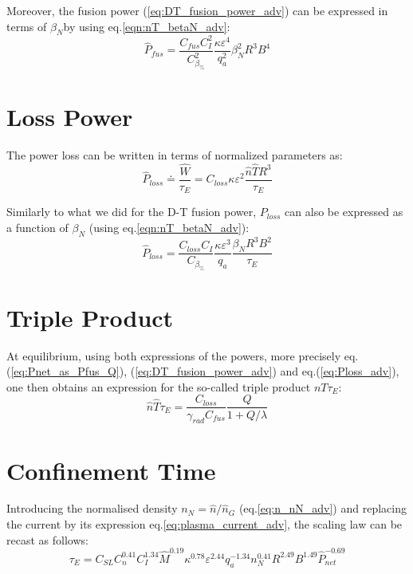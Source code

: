 Moreover, the fusion power (\ref{eq:DT_fusion_power_adv}) can be expressed in terms of $\beta_N$by using eq.\ref{eqn:nT_betaN_adv}:
\begin{equation}
\boxed{
		\hat P_{fus} 
	= 
	\frac{C_{fus}C_I^2}{C_{\beta_\%}^2} \frac{\kappa \varepsilon^4}{q_a^2} 
	\beta_N^2 R^3 B^4
}
\label{eq:DT_fusion_power_betaN_adv}
\end{equation}

\section{Loss Power}
The power loss can be written in terms of normalized parameters as:
\begin{equation}
	\hat P_{loss} \doteq \frac{\hat W}{\tau_E} 
	= C_{loss} \kappa \varepsilon^2  \frac{\hat n \hat T R^3}{\tau_E}
\label{eq:Ploss_adv}
\end{equation}

Similarly to what we did for the D-T fusion power, $P_{loss}$ can also be expressed as a function of $\beta_N$ (using eq.\ref{eqn:nT_betaN_adv}):
\begin{equation}
	\hat P_{loss} 
	= 
	\frac{C_{loss}C_I}{C_{\beta_\%}}  \frac{\kappa \varepsilon^3}{q_a}
	\frac{\beta_N R^3 B^2}{\tau_E}
\label{eq:Ploss_betaN_adv}
\end{equation}

\section{Triple Product}
At equilibrium, using both expressions of the powers, more precisely eq.(\ref{eq:Pnet_as_Pfus_Q}), (\ref{eq:DT_fusion_power_adv}) and eq.(\ref{eq:Ploss_adv}), one then obtains an expression for the so-called triple product $nT\tau_E$:
\begin{equation}
	\hat n \hat T \tau_E = \frac{C_{loss}}{\gamma_{rad} C_{fus}} \frac{Q}{1+Q/\lambda}
\label{eq:nTtau_Q_adv}
\end{equation}


\section{Confinement Time}
Introducing the normalised density $n_N = \hat n/\hat n_G$ (eq.\ref{eq:n_nN_adv}) and replacing the current by its expression eq.\ref{eq:plasma_current_adv}, the scaling law can be recast as follows:
\begin{equation*}
\tau_E = C_{SL} C_n^{0.41} C_I^{1.34} \hat M^{0.19} \kappa^{0.78} \varepsilon^{2.44} q_a^{-1.34}
n_N^{0.41} R^{2.49} B^{1.49} \hat P_{net}^{-0.69}
\end{equation*}

